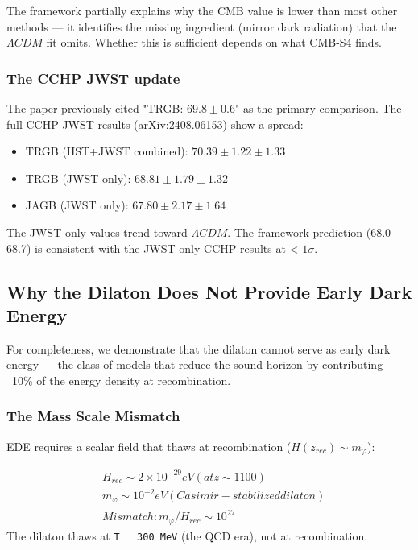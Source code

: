 \documentclass[aps,prd,preprint,superscriptaddress,longbibliography,floatfix]{revtex4-2}
\theoremstyle{remark}
\begin{document}
The framework partially explains why the CMB value is lower than most other methods --- it identifies the missing ingredient (mirror dark radiation) that the $\Lambda CDM$ fit omits. Whether this is sufficient depends on what CMB-S4 finds.


\subsubsection{The CCHP JWST update}

The paper previously cited "TRGB: $69.8 \pm 0.6$" as the primary comparison. The full CCHP JWST results (arXiv:2408.06153) show a spread:

\begin{itemize}
  \item TRGB (HST+JWST combined): $70.39 \pm 1.22 \pm 1.33$
  \item TRGB (JWST only): $68.81 \pm 1.79 \pm 1.32$
  \item JAGB (JWST only): $67.80 \pm 2.17 \pm 1.64$
\end{itemize}

The JWST-only values trend toward $\Lambda CDM$. The framework prediction (68.0--68.7) is consistent with the JWST-only CCHP results at < $1\sigma$.



\subsection{Why the Dilaton Does Not Provide Early Dark Energy}

For completeness, we demonstrate that the dilaton cannot serve as early dark energy --- the class of models that reduce the sound horizon by contributing ~10\% of the energy density at recombination.


\subsubsection{The Mass Scale Mismatch}

EDE requires a scalar field that thaws at recombination ($H(z_{rec}) \sim  m_\varphi$):


\begin{align}
    & H_{rec} \sim  2 \times 10^{-29} eV     (at z \sim  1100) \\
    & m_\varphi   \sim  10^{-2} eV           (Casimir-stabilized dilaton) \\
    & Mismatch: m_\varphi / H_{rec} \sim  10^{27}
\end{align}
The dilaton thaws at \texttt{T ~ 300 MeV} (the QCD era), not at recombination.
\end{document}
